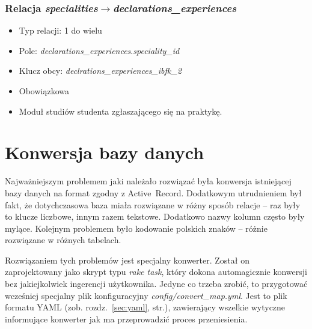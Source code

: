 \documentclass[a4paper,12pt,oneside]{report}
\begin{document}
\subsubsection{Relacja \emph{specialities}$\to$\emph{declarations\_experiences}}
\label{subsub:specialities-declarations_experiences}
\begin{itemize}
  \item Typ relacji: 1 do wielu
  \item Pole: \emph{declarations\_experiences}.\emph{speciality\_id}
  \item Klucz obcy: \emph{declrations\_experiences\_ibfk\_2}
  \item Obowiązkowa
  \item Moduł studiów studenta zgłaszającego się na praktykę.
\end{itemize}

\section{Konwersja bazy danych}
\label{sec:db-konwersja}
Najważniejszym problemem jaki należało rozwiązać była konwersja istniejącej bazy danych na format zgodny z Active~Record. Dodatkowym utrudnieniem był fakt, że dotychczasowa baza miała rozwiązane w różny sposób relacje -- raz były to klucze liczbowe, innym razem tekstowe. Dodatkowo nazwy kolumn często były mylące. Kolejnym problemem było kodowanie polskich znaków -- różnie rozwiązane w różnych tabelach.

Rozwiązaniem tych problemów jest specjalny konwerter. Został on zaprojektowany jako skrypt typu \emph{rake task}, który dokona automagicznie konwersji bez jakiejkolwiek ingerencji użytkownika. Jedyne co trzeba zrobić, to przygotować wcześniej specjalny plik konfiguracyjny \emph{config/convert\_map.yml}. Jest to plik formatu YAML (zob. rozdz.~\ref{sec:yaml}, str.\pageref{sec:yaml}), zawierający wszelkie wytyczne informujące konwerter jak ma przeprowadzić proces przeniesienia.
\end{document}
